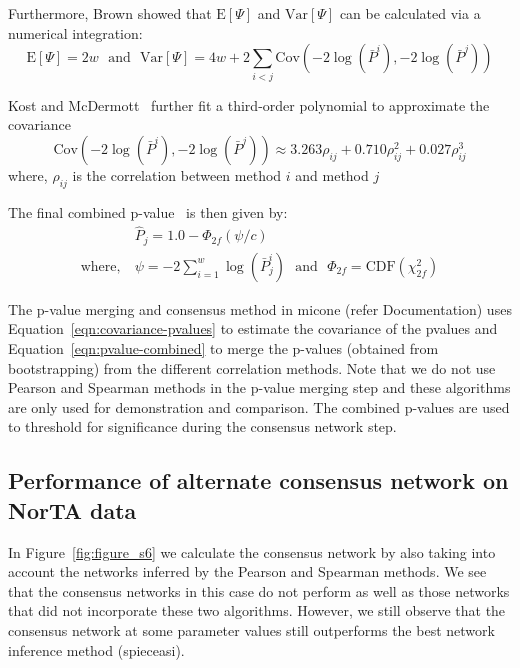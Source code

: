   Furthermore, Brown showed that $\mathrm{E}[\Psi]$ and $\mathrm{Var}[\Psi]$ can be calculated via a numerical integration:
  \begin{equation*}
    \mathrm{E}[\Psi] = 2w ~~~\text{and}~~~ \mathrm{Var}[\Psi] = 4w + 2\sum_{i<j} \mathrm{Cov}\left( -2\log(\bar{P}^i), -2\log(\bar{P}^j) \right)
  \end{equation*}

  Kost and McDermott~\cite{kost_combining_2002} further fit a third-order polynomial to approximate the covariance
  \begin{equation}
    \mathrm{Cov}\left( -2\log(\bar{P}^i), -2\log(\bar{P}^j) \right) \approx 3.263 \rho_{ij} + 0.710 \rho_{ij}^2 + 0.027 \rho_{ij}^3
    \label{eqn:covariance-pvalues}
  \end{equation}
  where, $\rho_{ij}$ is the correlation between method $i$ and method $j$

  The final combined p-value~\cite{Poole_Gibbs_Shmulevich_Bernard_Knijnenburg_2016} is then given by:
  \begin{equation}
    \begin{aligned}
        & \hat{P}_j = 1.0 - \Phi_{2f}\left( \psi / c \right) \\
        \text{where},~ &\psi = -2 \sum_{i=1}^w \log(\bar{P}^i_j) ~~~\text{and}~~~ \Phi_{2f} = \mathrm{CDF}\left( \chi^2_{2f} \right)
    \end{aligned}
    \label{eqn:pvalue-combined}
  \end{equation}

  The p-value merging and consensus method in \ac{micone} (refer Documentation) uses Equation~\ref{eqn:covariance-pvalues} to estimate the covariance of the pvalues and Equation~\ref{eqn:pvalue-combined} to merge the p-values (obtained from bootstrapping) from the different correlation methods.
  Note that we do not use Pearson and Spearman methods in the p-value merging step and these algorithms are only used for demonstration and comparison.
  The combined p-values are used to threshold for significance during the consensus network step.

  \subsection*{Performance of alternate consensus network on NorTA data}

    In Figure~\ref{fig:figure_s6} we calculate the consensus network by also taking into account the networks inferred by the Pearson and Spearman methods.
    We see that the consensus networks in this case do not perform as well as those networks that did not incorporate these two algorithms.
    However, we still observe that the consensus network at some parameter values still outperforms the best network inference method (\ac{spieceasi}).

